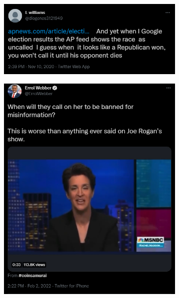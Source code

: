 \begin{figure}
\begin{subfigure}{.3\textwidth}
  \centering
  \includegraphics[width=1\linewidth]{figures/high-var-user-tweet1.png}
\label{fig:twitter-misinformation1}
\end{subfigure}%
\begin{subfigure}{.3\textwidth}
  \centering
  \includegraphics[width=1\linewidth]{figures/high-var-user-tweet2.png}
  \label{fig:twitter-misinformation2}
\end{subfigure}
\begin{subfigure}{.3\textwidth}

\end{subfigure}
\end{figure}
